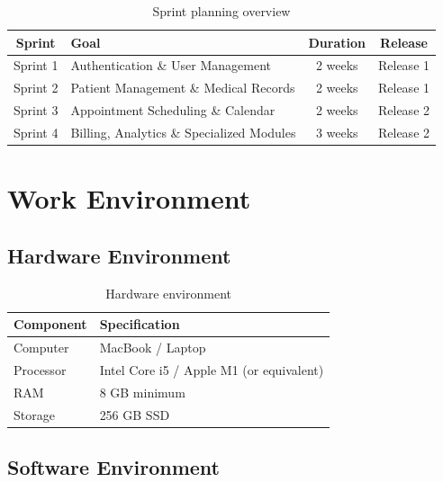 \documentclass[12pt,a4paper,oneside]{report}
\begin{document}
\begin{table}[H]
\centering
\caption{Sprint planning overview}
\label{tab:sprint_planning}
\begin{tabular}{|c|p{5cm}|c|c|}
\hline
\textbf{Sprint} & \textbf{Goal} & \textbf{Duration} & \textbf{Release} \\
\hline
Sprint 1 & Authentication \& User Management & 2 weeks & Release 1 \\
\hline
Sprint 2 & Patient Management \& Medical Records & 2 weeks & Release 1 \\
\hline
Sprint 3 & Appointment Scheduling \& Calendar & 2 weeks & Release 2 \\
\hline
Sprint 4 & Billing, Analytics \& Specialized Modules & 3 weeks & Release 2 \\
\hline
\end{tabular}
\end{table}

\section{Work Environment}

\subsection{Hardware Environment}

\begin{table}[H]
\centering
\caption{Hardware environment}
\label{tab:hardware}
\begin{tabular}{|p{4cm}|p{9cm}|}
\hline
\textbf{Component} & \textbf{Specification} \\
\hline
Computer & MacBook / Laptop \\
\hline
Processor & Intel Core i5 / Apple M1 (or equivalent) \\
\hline
RAM & 8 GB minimum \\
\hline
Storage & 256 GB SSD \\
\hline
\end{tabular}
\end{table}

\subsection{Software Environment}
\end{document}
